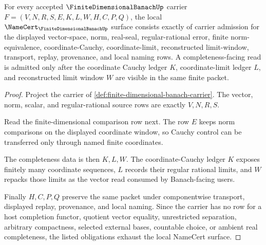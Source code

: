 \begin{theorem}
\label{thm:finite-dimensional-banach-namecert-obligations}
For every accepted $\FiniteDimensionalBanachUp$ carrier $F=(V,N,R,S,E,K,L,W,H,C,P,Q)$, the local $\NameCert_{\FiniteDimensionalBanachUp}$ surface consists exactly of carrier admission for the displayed vector-space, norm, real-seal, regular-rational error, finite norm-equivalence, coordinate-Cauchy, coordinate-limit, reconstructed limit-window, transport, replay, provenance, and local naming rows. A completeness-facing read is admitted only after the coordinate Cauchy ledger $K$, coordinate-limit ledger $L$, and reconstructed limit window $W$ are visible in the same finite packet.
\end{theorem}
\begin{proof}
Project the carrier of \autoref{def:finite-dimensional-banach-carrier}. The vector, norm, scalar, and regular-rational source rows are exactly $V,N,R,S$.

Read the finite-dimensional comparison row next. The row $E$ keeps norm comparisons on the displayed coordinate window, so Cauchy control can be transferred only through named finite coordinates.

The completeness data is then $K,L,W$. The coordinate-Cauchy ledger $K$ exposes finitely many coordinate sequences, $L$ records their regular rational limits, and $W$ repacks those limits as the vector read consumed by Banach-facing users.

Finally $H,C,P,Q$ preserve the same packet under componentwise transport, displayed replay, provenance, and local naming. Since the carrier has no row for a host completion functor, quotient vector equality, unrestricted separation, arbitrary compactness, selected external bases, countable choice, or ambient real completeness, the listed obligations exhaust the local NameCert surface.
\end{proof}


